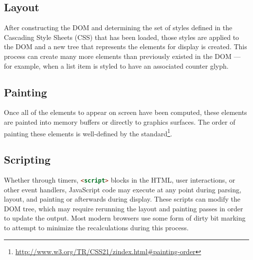 \subsection{Layout}

After constructing the DOM and determining the set of styles defined in the Cascading Style Sheets (CSS) that has
been loaded, those styles are applied to the DOM and a new tree that represents the elements for display is
created.
This process can create many more elements than previously existed in the DOM --- for example, when a list item is
styled to have an associated counter glyph.

\subsection{Painting}

Once all of the elements to appear on screen have been computed, these elements are painted into memory buffers or
directly to graphics surfaces.
The order of painting these elements is well-defined by the standard\footnote{\url{http://www.w3.org/TR/CSS21/zindex.html#painting-order}}.

\subsection{Scripting}

Whether through timers, \lstinline[language=HTML]{<script>} blocks in the HTML, user interactions, or other event handlers,
JavaScript code may execute at any point during parsing, layout, and painting or afterwards during display.
These scripts can modify the DOM tree, which may require rerunning the layout and painting passes in order to update
the output.
Most modern browsers use some form of dirty bit marking to attempt to minimize the recalculations during this process.


